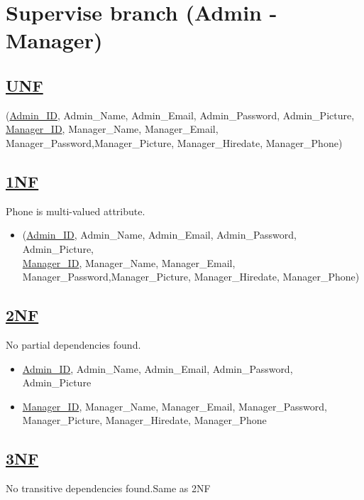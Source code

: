 \section{\texorpdfstring{\centering Supervise branch (Admin - Manager)}{Supervise branch (Admin - Manager)}}
\subsection*{\underline{UNF}}

(\underline{Admin\_ID}, Admin\_Name, Admin\_Email, Admin\_Password, Admin\_Picture,\\
\underline{Manager\_ID}, Manager\_Name, Manager\_Email, Manager\_Password,Manager\_Picture, Manager\_Hiredate, Manager\_Phone)

\subsection*{\underline{1NF}}
Phone is multi-valued attribute.
\vskip 0.2in

\begin{itemize}
    \item (\underline{Admin\_ID}, Admin\_Name, Admin\_Email, Admin\_Password, Admin\_Picture,\\
          \underline{Manager\_ID}, Manager\_Name, Manager\_Email, Manager\_Password,Manager\_Picture, Manager\_Hiredate, Manager\_Phone)
\end{itemize}

\subsection*{\underline{2NF}}
No partial dependencies found.
\vskip 0.2in

\begin{itemize}
    \item \underline{Admin\_ID}, Admin\_Name, Admin\_Email, Admin\_Password, Admin\_Picture
    \item \underline{Manager\_ID}, Manager\_Name, Manager\_Email, Manager\_Password, Manager\_Picture, Manager\_Hiredate, Manager\_Phone
\end{itemize}

\subsection*{\underline{3NF}}
No transitive dependencies found.Same as 2NF

